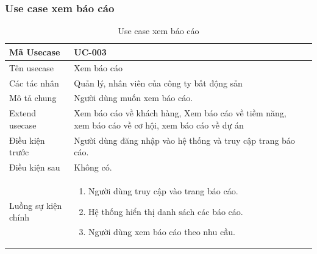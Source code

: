 \documentclass[12pt,a4paper]{article}
\begin{document}
    \subsubsection*{Use case xem báo cáo}
    \begin{table}[H]
        \centering
        \begin{tabular}{|p{3.5cm}|p{11.5cm}|c|}
            \hline
            Mã Usecase      & UC-003                                                                                           \\
            \hline
            Tên usecase     & Xem báo cáo                                                                                      \\
            \hline
            Các tác nhân    & Quản lý, nhân viên của công ty bất động sản                                                      \\
            \hline
            Mô tả chung     & Người dùng muốn xem báo cáo.                                                                     \\
            \hline
            Extend usecase  & Xem báo cáo về khách hàng, Xem báo cáo về tiềm năng, xem báo cáo về cơ hội, xem báo cáo về dự án \\
            \hline
            Điều kiện trước & Người dùng đăng nhập vào hệ thống và truy cập trang báo cáo.                                     \\
            \hline
            Điều kiện sau   & Không có.                                                                                        \\
            \hline
            Luồng sự kiện chính & \vspace{-.8cm}\begin{enumerate}
                                                    \item Người dùng truy cập vào trang báo cáo.
                                                    \item Hệ thống hiển thị danh sách các báo cáo.
                                                    \item Người dùng xem báo cáo theo nhu cầu.
            \end{enumerate}
            \\
            \hline
        \end{tabular}
        \caption{Use case xem báo cáo}
    \end{table}
\end{document}
